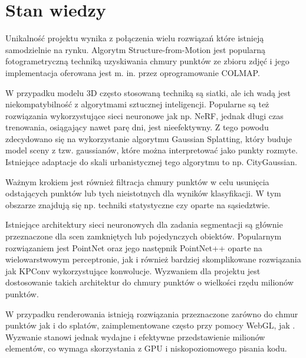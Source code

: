 \section{Stan wiedzy}

Unikalność projektu wynika z połączenia wielu rozwiązań które istnieją samodzielnie na rynku. Algorytm Structure-from-Motion \cite{Schonberger_2016_CVPR} jest popularną fotogrametryczną techniką uzyskiwania chmury punktów ze zbioru zdjęć i jego implementacja oferowana jest m. in. przez oprogramowanie COLMAP. 

W przypadku modelu 3D często stosowaną techniką są siatki, ale ich wadą jest niekompatybilność z algorytmami sztucznej inteligencji. Popularne są też rozwiązania wykorzystujące sieci neuronowe jak np. NeRF\cite{mildenhall2020nerfrepresentingscenesneural}, jednak długi czas trenowania, osiągający nawet parę dni, jest nieefektywny. Z tego powodu zdecydowano się na wykorzystanie algorytmu Gaussian Splatting\cite{kerbl3Dgaussians}, który buduje model sceny z tzw. gaussianów, które można interpretować jako punkty rozmyte. Istniejące adaptacje do skali urbanistycznej tego algorytmu to np. CityGaussian\cite{liu2024citygaussian}.

Ważnym krokiem jest również filtracja chmury punktów \cite{HAN2017103} w celu usunięcia odstających punktów lub tych nieistotnych dla wyników klasyfikacji. W tym obszarze znajdują się np. techniki statystyczne czy oparte na sąsiedztwie. 

Istniejące architektury sieci neuronowych dla zadania segmentacji są głównie przeznaczone dla scen zamkniętych lub pojedynczych obiektów. Popularnym rozwiązaniem jest PointNet\cite{qi2016pointnet} oraz jego następnik PointNet++\cite{qi2017pointnetdeephierarchicalfeature} oparte na wielowarstwowym perceptronie, jak i również bardziej skomplikowane rozwiązania jak KPConv\cite{thomas2019kpconvflexibledeformableconvolution} wykorzystujące konwolucje. Wyzwaniem dla projektu jest dostosowanie takich architektur do chmury punktów o wielkości rzędu milionów punktów.  

W przypadku renderowania istnieją rozwiązania przeznaczone zarówno do chmur punktów jak i do splatów, zaimplementowane często przy pomocy WebGL, jak \cite{splatviewer}. Wyzwanie stanowi jednak wydajne i efektywne przedstawienie milionów elementów, co wymaga skorzystania z GPU i niskopoziomowego pisania kodu. 

